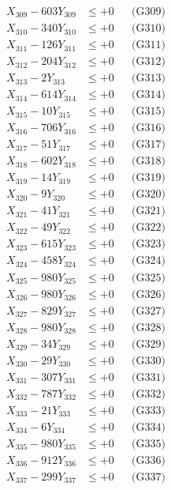 \documentclass[a4paper,10pt]{article}
\begin{document}
{\begin{align}
X_{309} - 603Y_{309} &\leq +0 && \text{(G309)} \\
X_{310} - 340Y_{310} &\leq +0 && \text{(G310)} \\
\allowbreak
X_{311} - 126Y_{311} &\leq +0 && \text{(G311)} \\
X_{312} - 204Y_{312} &\leq +0 && \text{(G312)} \\
X_{313} - 2Y_{313} &\leq +0 && \text{(G313)} \\
X_{314} - 614Y_{314} &\leq +0 && \text{(G314)} \\
X_{315} - 10Y_{315} &\leq +0 && \text{(G315)} \\
X_{316} - 706Y_{316} &\leq +0 && \text{(G316)} \\
X_{317} - 51Y_{317} &\leq +0 && \text{(G317)} \\
X_{318} - 602Y_{318} &\leq +0 && \text{(G318)} \\
X_{319} - 14Y_{319} &\leq +0 && \text{(G319)} \\
X_{320} - 9Y_{320} &\leq +0 && \text{(G320)} \\
\allowbreak
X_{321} - 41Y_{321} &\leq +0 && \text{(G321)} \\
X_{322} - 49Y_{322} &\leq +0 && \text{(G322)} \\
X_{323} - 615Y_{323} &\leq +0 && \text{(G323)} \\
X_{324} - 458Y_{324} &\leq +0 && \text{(G324)} \\
X_{325} - 980Y_{325} &\leq +0 && \text{(G325)} \\
X_{326} - 980Y_{326} &\leq +0 && \text{(G326)} \\
X_{327} - 829Y_{327} &\leq +0 && \text{(G327)} \\
X_{328} - 980Y_{328} &\leq +0 && \text{(G328)} \\
X_{329} - 34Y_{329} &\leq +0 && \text{(G329)} \\
X_{330} - 29Y_{330} &\leq +0 && \text{(G330)} \\
\allowbreak
X_{331} - 307Y_{331} &\leq +0 && \text{(G331)} \\
X_{332} - 787Y_{332} &\leq +0 && \text{(G332)} \\
X_{333} - 21Y_{333} &\leq +0 && \text{(G333)} \\
X_{334} - 6Y_{334} &\leq +0 && \text{(G334)} \\
X_{335} - 980Y_{335} &\leq +0 && \text{(G335)} \\
X_{336} - 912Y_{336} &\leq +0 && \text{(G336)} \\
X_{337} - 299Y_{337} &\leq +0 && \text{(G337)} \\

\end{align}}
\end{document}
